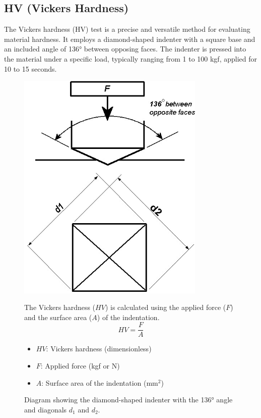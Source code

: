 \documentclass{article}
\begin{document}
\subsection{HV (Vickers Hardness)}  
    The Vickers hardness (HV) test is a precise and versatile method for evaluating material hardness. It employs a diamond-shaped indenter with a square base and an included angle of 136° between opposing faces. 
    The indenter is pressed into the material under a specific load, typically ranging from 1 to 100 kgf, applied for 10 to 15 seconds.
    \begin{figure}[H]
        \centering
        \begin{minipage}{0.45\textwidth}\centering
            \vspace{1em}\includegraphics[width=0.8\textwidth]{figures/3537580_orig-0000.jpg}
            \caption{Diagram showing the diamond-shaped indenter with the 136° angle and diagonals \(d_1\) and \(d_2\).}
            \label{fig:vickers-diagram}
        \end{minipage}\hfill
        \begin{minipage}{0.51\textwidth}
            The Vickers hardness (\(HV\)) is calculated using the applied force (\(F\)) and the surface area (\(A\)) of the indentation. 
            \begin{equation}
                    HV = \frac{F}{A}
            \end{equation}
            \begin{itemize}[itemsep=-1mm]
                \item \(HV\): Vickers hardness (dimensionless)
                \item \(F\): Applied force (kgf or N)
                \item \(A\): Surface area of the indentation (mm\(^2\))
                

\end{itemize}
\end{minipage}
\end{figure}
\end{document}
